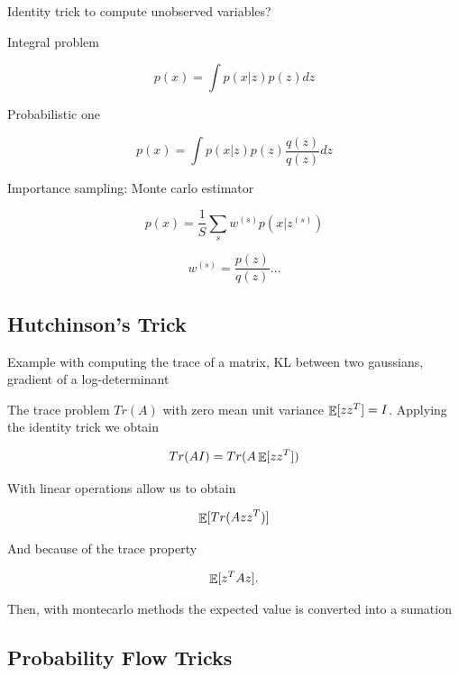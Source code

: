 \documentclass[b5paper]{report}
\begin{document}
Identity trick to compute unobserved variables?

Integral problem

\begin{equation}
  p(x) = \int p(x|z)p(z)dz
\end{equation}

Probabilistic one

\begin{equation}
  p(x) = \int p(x|z)p(z)\frac{q(z)}{q(z)}dz
\end{equation}


Importance sampling: Monte carlo estimator

\begin{equation}
  p(x) = \frac{1}{S} \sum_s w^{(s)} p(x|z^{(s)})
\end{equation}

\begin{equation}
  w^{(s)} = \frac{p(z)}{q(z)} \dots
\end{equation}

\subsection{Hutchinson's Trick}

Example with computing the trace of a matrix, KL between two gaussians,
gradient of a log-determinant

The trace problem $Tr(A)$ with zero mean unit variance $\operatorname*{\mathbb{\mathop{E}}}[zz^T] = I$.
Applying the identity trick we obtain

\begin{equation}
Tr(AI) = Tr(A \operatorname*{\mathbb{\mathop{E}}}[zz^T])
\end{equation}

With linear operations allow us to obtain

\begin{equation}
\operatorname*{\mathbb{\mathop{E}}}[Tr(Azz^T)]
\end{equation}

And because of the trace property

\begin{equation}
\operatorname*{\mathbb{\mathop{E}}}[z^T Az].
\end{equation}

Then, with montecarlo methods the expected value is converted into a sumation

\subsection{Probability Flow Tricks}
\end{document}
